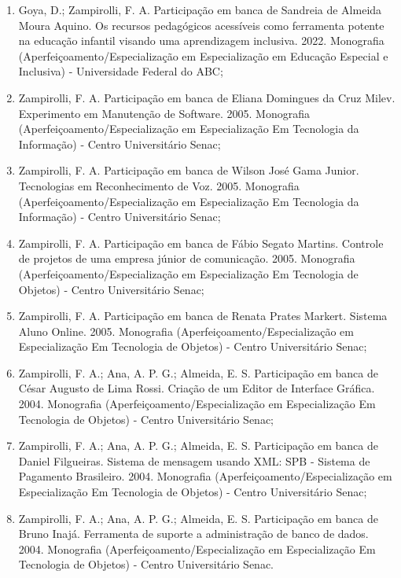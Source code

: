 \begin{enumerate}
    \item Goya, D.; Zampirolli, F. A. Participação em banca de Sandreia de Almeida Moura Aquino. Os recursos pedagógicos acessíveis como ferramenta potente na educação infantil visando uma aprendizagem inclusiva. 2022. Monografia (Aperfeiçoamento/Especialização em Especialização em Educação Especial e Inclusiva) - Universidade Federal do ABC;
    \item Zampirolli, F. A. Participação em banca de Eliana Domingues da Cruz Milev. Experimento em Manutenção de Software. 2005. Monografia (Aperfeiçoamento/Especialização em Especialização Em Tecnologia da Informação) - Centro Universitário Senac;
    \item Zampirolli, F. A. Participação em banca de Wilson José Gama Junior. Tecnologias em Reconhecimento de Voz. 2005. Monografia (Aperfeiçoamento/Especialização em Especialização Em Tecnologia da Informação) - Centro Universitário Senac;
    \item Zampirolli, F. A. Participação em banca de Fábio Segato Martins. Controle de projetos de uma empresa júnior de comunicação. 2005. Monografia (Aperfeiçoamento/Especialização em Especialização Em Tecnologia de Objetos) - Centro Universitário Senac;
    \item Zampirolli, F. A. Participação em banca de Renata Prates Markert. Sistema Aluno Online. 2005. Monografia (Aperfeiçoamento/Especialização em Especialização Em Tecnologia de Objetos) - Centro Universitário Senac;
    \item Zampirolli, F. A.; Ana, A. P. G.; Almeida, E. S. Participação em banca de César Augusto de Lima Rossi. Criação de um Editor de Interface Gráfica. 2004. Monografia (Aperfeiçoamento/Especialização em Especialização Em Tecnologia de Objetos) - Centro Universitário Senac;
    \item Zampirolli, F. A.; Ana, A. P. G.; Almeida, E. S. Participação em banca de Daniel Filgueiras. Sistema de mensagem usando XML: SPB - Sistema de Pagamento Brasileiro. 2004. Monografia (Aperfeiçoamento/Especialização em Especialização Em Tecnologia de Objetos) - Centro Universitário Senac;
    \item Zampirolli, F. A.; Ana, A. P. G.; Almeida, E. S. Participação em banca de Bruno Inajá. Ferramenta de suporte a administração de banco de dados. 2004. Monografia (Aperfeiçoamento/Especialização em Especialização Em Tecnologia de Objetos) - Centro Universitário Senac.
\end{enumerate}

